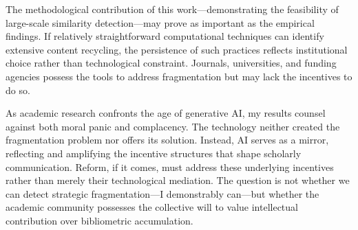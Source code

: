 \documentclass[12pt]{article}
\begin{document}
The methodological contribution of this work—demonstrating the feasibility of large-scale similarity detection—may prove as important as the empirical findings. If relatively straightforward computational techniques can identify extensive content recycling, the persistence of such practices reflects institutional choice rather than technological constraint. Journals, universities, and funding agencies possess the tools to address fragmentation but may lack the incentives to do so.

As academic research confronts the age of generative AI, my results counsel against both moral panic and complacency. The technology neither created the fragmentation problem nor offers its solution. Instead, AI serves as a mirror, reflecting and amplifying the incentive structures that shape scholarly communication. Reform, if it comes, must address these underlying incentives rather than merely their technological mediation. The question is not whether we can detect strategic fragmentation—I demonstrably can—but whether the academic community possesses the collective will to value intellectual contribution over bibliometric accumulation.


\end{document}
